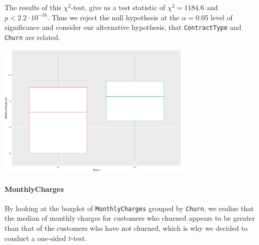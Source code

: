 \documentclass[man, floatsintext]{apa6}
\begin{document}
\hspace{0.5mm}

The results of this $\chi^2$-test, give us a test statistic of $\chi^2 = 1184.6$ and $p < 2.2 \cdot 10^{-16}$. Thus we reject the null hypothesis at the $\alpha = 0.05$ level of significance and consider our alternative hypothesis, that \texttt{ContractType} and \texttt{Churn} are related.

\hspace{0.5mm}

\noindent\begin{minipage}{0.54\textwidth}
\includegraphics[width = \linewidth, height = 64mm]{boxplot_MonthlyChargesvsChurn}
\end{minipage}
\hfill
\begin{minipage}{0.43\textwidth}
   \paragraph{MonthlyCharges}
   By looking at the boxplot of \texttt{MonthlyCharges} grouped by \texttt{Churn}, we realize that the median of monthly charges for customers who churned appears to be greater than that of the customers who have not churned, which is why we decided to conduct a one-sided $t$-test.\\
\end{minipage}
\end{document}
